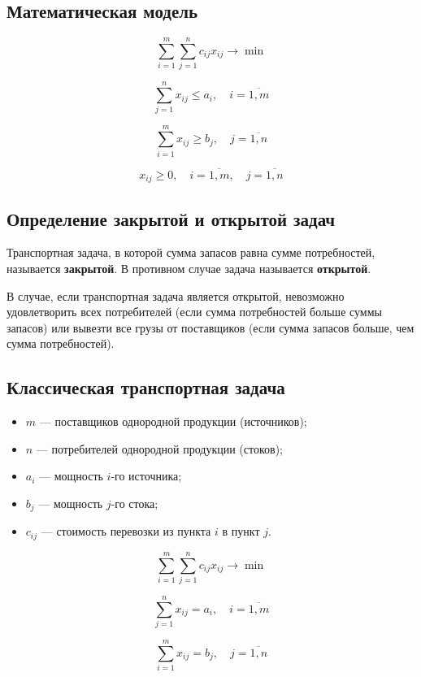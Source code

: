 \documentclass[17pt]{extarticle}
\begin{document}
\subsection{Математическая модель}
\[
    \sum_{i=1}^{m} \sum_{j=1}^{n} c_{ij}x_{ij} \rightarrow \min
\]

\[
    \sum_{j=1}^{n} x_{ij} \leq a_i, \quad i = \overline{1, m}
\]

\[
    \sum_{i=1}^{m} x_{ij} \geq b_j, \quad j = \overline{1, n}
\]

\[
    x_{ij} \geq 0, \quad i = \overline{1, m}, \quad j = \overline{1, n}
\]

\subsection{Определение закрытой и открытой задач}
\begin{definition}
    Транспортная задача, в которой сумма запасов равна сумме потребностей, называется \textbf{закрытой}. В противном случае задача называется \textbf{открытой}.
\end{definition}

В случае, если транспортная задача является открытой, невозможно удовлетворить всех потребителей (если сумма потребностей больше суммы запасов) или вывезти все грузы от поставщиков (если сумма запасов больше, чем сумма потребностей).

\subsection{Классическая транспортная задача}
\begin{itemize}
    \item \( m \) — поставщиков однородной продукции (источников);
    \item \( n \) — потребителей однородной продукции (стоков);
    \item \( a_i \) — мощность \( i \)-го источника;
    \item \( b_j \) — мощность \( j \)-го стока;
    \item \( c_{ij} \) — стоимость перевозки из пункта \( i \) в пункт \( j \).
\end{itemize}

\[
    \sum_{i=1}^m \sum_{j=1}^n c_{ij} x_{ij} \rightarrow \min
\]

\[
    \sum_{j=1}^n x_{ij} = a_i, \quad i = \overline{1, m}
\]

\[
    \sum_{i=1}^m x_{ij} = b_j, \quad j = \overline{1, n}
\]
\end{document}
